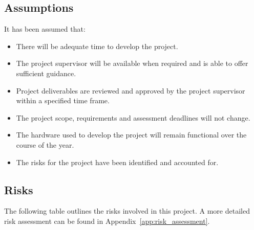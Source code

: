 \documentclass[a4paper]{article}
\begin{document}
{		\subsection{Assumptions} {
		\label{sec:assumptions}
		
			It has been assumed that:
			
			\begin{itemize}
				\item There will be adequate time to develop the project.
				\item The project supervisor will be available when required and is able to offer sufficient guidance.
				\item Project deliverables are reviewed and approved by the project supervisor within a specified time frame.
				\item The project scope, requirements and assessment deadlines will not change.
				\item The hardware used to develop the project will remain functional over the course of the year.
				\item The risks for the project have been identified and accounted for.
			\end{itemize}
		
		}
		
		\subsection{Risks} {
		\label{sec:risks}

			The following table outlines the risks involved in this project. A more detailed risk assessment can be found in Appendix~\ref{app:risk_assessment}.
			
}}
\end{document}
